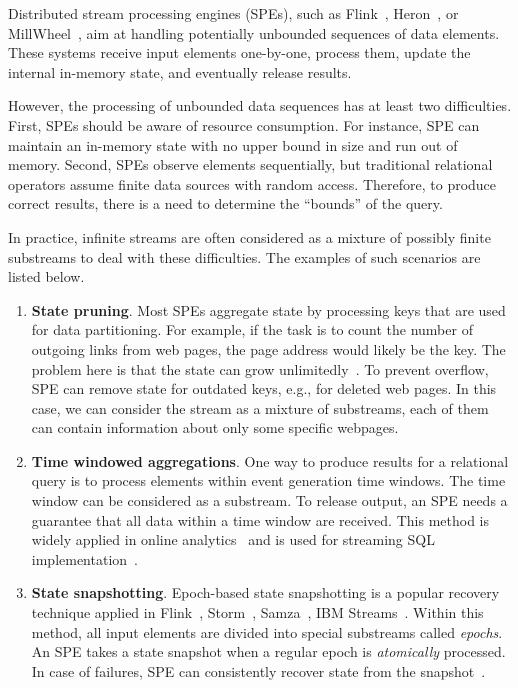 \label {fs-acker-intro}

Distributed stream processing engines (SPEs), such as Flink~\cite{carbone2015apache}, Heron~\cite{Kulkarni:2015:THS:2723372.2742788}, or MillWheel~\cite{Akidau:2013:MFS:2536222.2536229}, aim at handling potentially unbounded sequences of data elements. These systems receive input elements one-by-one, process them, update the internal in-memory state, and eventually release results. 

However, the processing of unbounded data sequences has at least two difficulties. First, SPEs should be aware of resource consumption. For instance, SPE can maintain an in-memory state with no upper bound in size and run out of memory. Second, SPEs observe elements sequentially, but traditional relational operators assume finite data sources with random access. Therefore, to produce correct results, there is a need to determine the ``bounds'' of the query.

In practice, infinite streams are often considered as a mixture of possibly finite substreams to deal with these difficulties. The examples of such scenarios are listed below.
\begin{enumerate}
    \item {\bf State pruning}. Most SPEs aggregate state by processing keys that are used for data partitioning. For example, if the task is to count the number of outgoing links from web pages, the page address would likely be the key. The problem here is that the state can grow unlimitedly~\cite{Tucker:2003:EPS:776752.776780}. To prevent overflow, SPE can remove state for outdated keys, e.g., for deleted web pages. In this case, we can consider the stream as a mixture of substreams, each of them can contain information about only some specific webpages.  
    \item {\bf Time windowed aggregations}. One way to produce results for a relational query is to process elements within event generation time windows. The time window can be considered as a substream. To release output, an SPE needs a guarantee that all data within a time window are received. This method is widely applied in online analytics~\cite{traub2018scotty} and is used for streaming SQL implementation~\cite{Begoli:2019:OSR:3299869.3314040}.
    \item {\bf State snapshotting}. Epoch-based state snapshotting is a popular recovery technique applied in Flink~\cite{Carbone:2017:SMA:3137765.3137777}, Storm~\cite{Toshniwal:2014:STO:2588555.2595641}, Samza~\cite{Noghabi:2017:SSS:3137765.3137770}, IBM Streams~\cite{jacques2016consistent}. Within this method, all input elements are divided into special substreams called {\em epochs}. An SPE takes a state snapshot when a regular epoch is {\em atomically} processed. In case of failures, SPE can consistently recover state from the snapshot~\cite{2015arXiv150608603C}. 
\end{enumerate}

